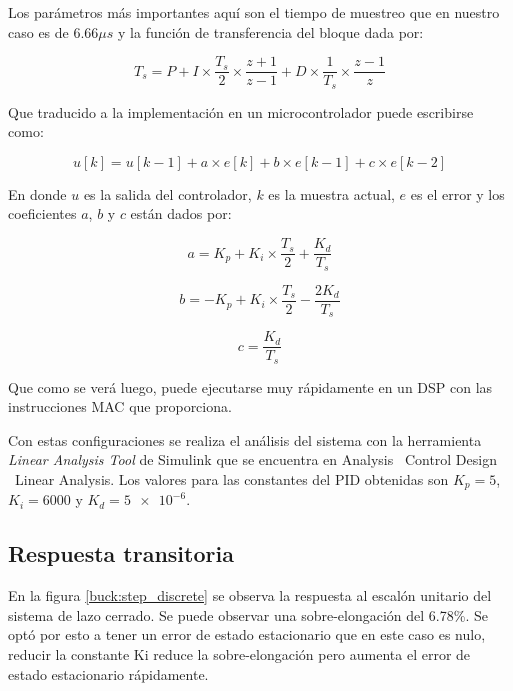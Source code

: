 \documentclass[12pt]{report}
\begin{document}
	Los parámetros más importantes aquí son el tiempo de muestreo que en nuestro caso es de $6.66 \mu s$ y la función de transferencia del bloque dada por:
	
	\begin{equation}
		T_s = P + I \times \frac{T_s}{2} \times \frac{z+1}{z-1} + D \times \frac{1}{T_s} \times \frac{z-1}{z}
		\label{pid:algorithm}
	\end{equation}
	
	Que traducido a la implementación en un microcontrolador puede escribirse como:
	
	\begin{equation}
		u[k] = u[k-1] + a \times e[k] + b \times e[k-1] + c \times e[k-2]
	\end{equation}
	
	En donde $u$ es la salida del controlador, $k$ es la muestra actual, $e$ es el error y los coeficientes $a$, $b$ y $c$ están dados por:
	
	\begin{equation}
		a = K_p + K_i \times \frac{T_s}{2} + \frac{K_d}{T_s}
	\end{equation}
	
	\begin{equation}
		b = -K_p + K_i \times \frac{T_s}{2} - \frac{2K_d}{T_s}
	\end{equation}
	
	\begin{equation}
		c = \frac{K_d}{T_s}
	\end{equation}
	
	Que como se verá luego, puede ejecutarse muy rápidamente en un DSP con las instrucciones MAC que proporciona.
	
	Con estas configuraciones se realiza el análisis del sistema con la herramienta \textit{Linear Analysis Tool} de Simulink que se encuentra en Analysis \textrightarrow \ Control Design \textrightarrow \ Linear Analysis. Los valores para las constantes del PID obtenidas son $K_p = 5$, $K_i = 6000$ y $K_d = \num{5e-6}$.
	
	\subsection{Respuesta transitoria}
	
	En la figura \ref{buck:step_discrete} se observa la respuesta al escalón unitario del sistema de lazo cerrado. Se puede observar una sobre-elongación del 6.78\%. Se optó por esto a tener un error de estado estacionario que en este caso es nulo, reducir la constante Ki reduce la sobre-elongación pero aumenta el error de estado estacionario rápidamente.
	
\end{document}

